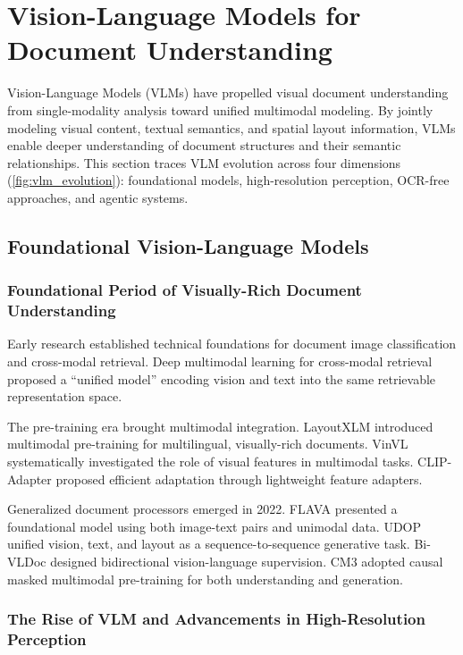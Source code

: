 \section{Vision-Language Models for Document Understanding}
\label{sec:vlm}

Vision-Language Models (VLMs) have propelled visual document understanding from single-modality analysis toward unified multimodal modeling. By jointly modeling visual content, textual semantics, and spatial layout information, VLMs enable deeper understanding of document structures and their semantic relationships. This section traces VLM evolution across four dimensions (\cref{fig:vlm_evolution}): foundational models, high-resolution perception, OCR-free approaches, and agentic systems.

\subsection{Foundational Vision-Language Models}

\subsubsection{Foundational Period of Visually-Rich Document Understanding}

Early research established technical foundations for document image classification and cross-modal retrieval. Deep multimodal learning for cross-modal retrieval \cite{wei2020deep} proposed a ``unified model'' encoding vision and text into the same retrievable representation space.

The pre-training era brought multimodal integration. LayoutXLM \cite{xu2021layoutxlm} introduced multimodal pre-training for multilingual, visually-rich documents. VinVL \cite{zhang2021vinvl} systematically investigated the role of visual features in multimodal tasks. CLIP-Adapter \cite{gao2021clipadapter} proposed efficient adaptation through lightweight feature adapters.

Generalized document processors emerged in 2022. FLAVA \cite{singh2022flava} presented a foundational model using both image-text pairs and unimodal data. UDOP \cite{li2022udop} unified vision, text, and layout as a sequence-to-sequence generative task. Bi-VLDoc \cite{yang2022bivldoc} designed bidirectional vision-language supervision. CM3 \cite{ai2022cm3} adopted causal masked multimodal pre-training for both understanding and generation.

\subsubsection{The Rise of VLM and Advancements in High-Resolution Perception}

